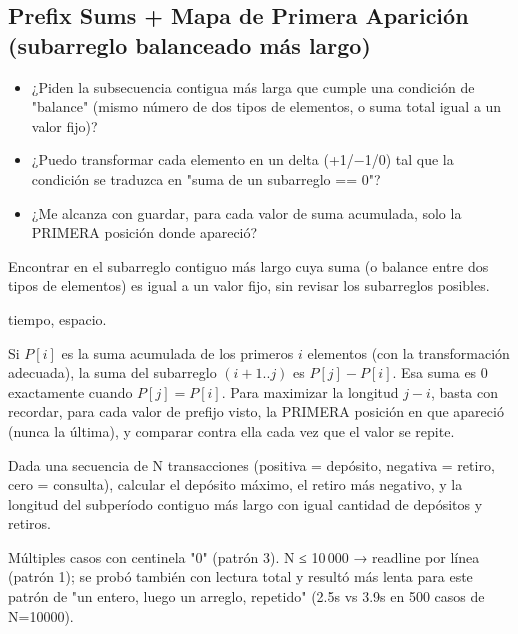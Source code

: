 \subsection{Prefix Sums + Mapa de Primera Aparición (subarreglo balanceado más largo)}
\label{alg:3-2}


\begin{itemize}
\item ¿Piden la subsecuencia contigua más larga que cumple una condición de "balance" (mismo número de dos tipos de elementos, o suma total igual a un valor fijo)?
\item ¿Puedo transformar cada elemento en un delta (+1/−1/0) tal que la condición se traduzca en "suma de un subarreglo == 0"?
\item ¿Me alcanza con guardar, para cada valor de suma acumulada, solo la PRIMERA posición donde apareció?
\end{itemize}

 Encontrar en  el subarreglo contiguo más largo cuya suma (o balance entre dos tipos de elementos) es igual a un valor fijo, sin revisar los  subarreglos posibles.

  tiempo,  espacio.

 Si $P[i]$ es la suma acumulada de los primeros $i$ elementos (con la transformación adecuada), la suma del subarreglo $(i+1..j)$ es $P[j]-P[i]$. Esa suma es 0 exactamente cuando $P[j]=P[i]$. Para maximizar la longitud $j-i$, basta con recordar, para cada valor de prefijo visto, la PRIMERA posición en que apareció (nunca la última), y comparar contra ella cada vez que el valor se repite.


Dada una secuencia de N transacciones (positiva = depósito, negativa = retiro, cero = consulta), calcular el depósito máximo, el retiro más negativo, y la longitud del subperíodo contiguo más largo con igual cantidad de depósitos y retiros.

 Múltiples casos con centinela "0" (patrón 3). N ≤ 10\,000 → readline por línea (patrón 1); se probó también con lectura total y resultó más lenta para este patrón de "un entero, luego un arreglo, repetido" (\aprox{}2.5s vs \aprox{}3.9s en 500 casos de N=10000).


